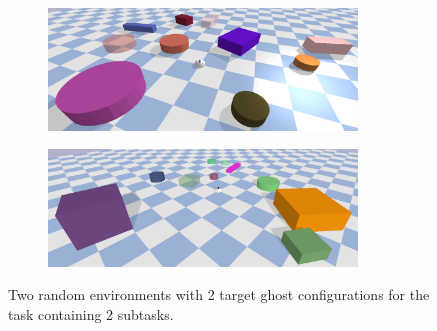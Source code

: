 \begin{figure}[H]
    \centering
    \begin{subfigure}{\textwidth}
    \centering
    \includegraphics[width=0.9\textwidth]{figures/results/random_1}
    \end{subfigure}

    \vspace{0.2cm}
    \begin{subfigure}{\textwidth}
    \centering
    \includegraphics[width=0.9\textwidth]{figures/results/random_2}
    \end{subfigure}
    \caption{Two random environments with 2 target ghost configurations for the task containing 2 subtasks.}%
    \label{fig:random_environnment}
\end{figure}

